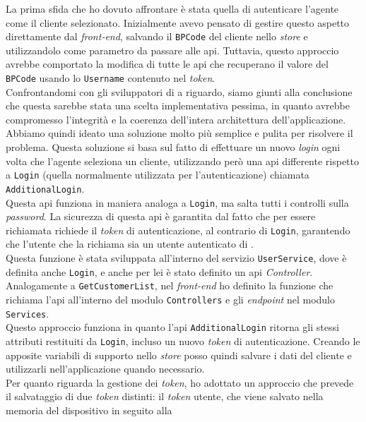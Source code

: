 La prima sfida che ho dovuto affrontare è stata quella di autenticare l'agente come il cliente selezionato. 
Inizialmente avevo pensato di gestire questo aspetto direttamente dal \textit{front-end}, salvando il \texttt{BPCode} 
del cliente nello \textit{store} e utilizzandolo come parametro da passare alle \gls{api}. Tuttavia, 
questo approccio avrebbe comportato la modifica di tutte le \gls{api} che recuperano il valore del 
\texttt{BPCode} usando lo \texttt{Username} contenuto nel \textit{token}.\\
Confrontandomi con gli sviluppatori di {\company} a riguardo, siamo giunti alla conclusione che questa sarebbe 
stata una scelta implementativa pessima, in quanto avrebbe compromesso l'integrità e la coerenza dell'intera 
architettura dell'applicazione.\\
Abbiamo quindi ideato una soluzione molto più semplice e pulita per risolvere il problema. Questa soluzione si basa 
sul fatto di effettuare un nuovo \textit{login} ogni volta che l'agente seleziona un cliente, utilizzando 
però una \gls{api} differente rispetto a \texttt{Login} (quella normalmente utilizzata per l'autenticazione) 
chiamata \texttt{AdditionalLogin}.\\
Questa \gls{api} funziona in maniera analoga a \texttt{Login}, ma salta tutti i controlli sulla \textit{password}. 
La sicurezza di questa \gls{api} è garantita dal fatto che per essere richiamata richiede il \textit{token} di 
autenticazione, al contrario di \texttt{Login}, garantendo che l'utente che la richiama sia un utente autenticato 
di {\movi}.\\
Questa funzione è stata sviluppata all'interno del servizio \texttt{UserService}, dove è definita anche \texttt{Login}, 
e anche per lei è stato definito un \gls{api} \textit{Controller}. 
Analogamente a \texttt{GetCustomerList}, nel \textit{front-end} ho definito la funzione che richiama l'\gls{api} 
all'interno del modulo \texttt{Controllers} e gli \textit{endpoint} nel modulo \texttt{Services}.\\
Questo approccio funziona in quanto l'\gls{api} \texttt{AdditionalLogin} ritorna gli stessi attributi restituiti 
da \texttt{Login}, incluso un nuovo \textit{token} di autenticazione. Creando le apposite variabili di supporto 
nello \textit{store} posso quindi salvare i dati del cliente e utilizzarli nell'applicazione quando necessario.\\
Per quanto riguarda la gestione dei \textit{token}, ho adottato un approccio che prevede il salvataggio di due 
\textit{token} distinti: il \textit{token} utente, che viene salvato nella memoria del dispositivo in seguito alla 
